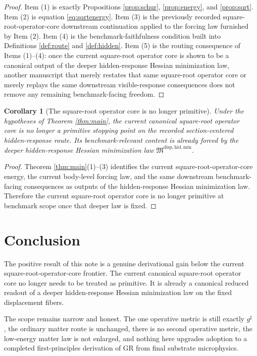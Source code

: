 \documentclass[11pt]{article}
\newcommand{\CompletedMetric}{g^{\sharp}}
\newcommand{\HiddenMinimizationPackage}{\mathfrak M^{\mathrm{disp,hid,min}}}
\newtheorem{corollary}{Corollary}
\begin{document}
\begin{proof}
Item (1) is exactly Propositions \ref{prop:schur}, \ref{prop:energy}, and \ref{prop:sqrt}. Item (2) is equation \eqref{eq:sqrtenergy}. Item (3) is the previously recorded square-root-operator-core downstream continuation applied to the forcing law furnished by Item (2). Item (4) is the benchmark-faithfulness condition built into Definitions \ref{def:route} and \ref{def:hidden}. Item (5) is the routing consequence of Items (1)--(4): once the current square-root operator core is shown to be a canonical output of the deeper hidden-response Hessian minimization law, another manuscript that merely restates that same square-root operator core or merely replays the same downstream visible-response consequences does not remove any remaining benchmark-facing freedom.
\end{proof}

\begin{corollary}[The square-root operator core is no longer primitive]
\label{cor:nonprimitive}
Under the hypotheses of Theorem \ref{thm:main}, the current canonical square-root operator core is no longer a primitive stopping point on the recorded section-centered hidden-response route. Its benchmark-relevant content is already forced by the deeper hidden-response Hessian minimization law \(\HiddenMinimizationPackage\).
\end{corollary}

\begin{proof}
Theorem \ref{thm:main}(1)--(3) identifies the current square-root-operator-core energy, the current body-level forcing law, and the same downstream benchmark-facing consequences as outputs of the hidden-response Hessian minimization law. Therefore the current square-root operator core is no longer primitive at benchmark scope once that deeper law is fixed.
\end{proof}

\section{Conclusion}

The positive result of this note is a genuine derivational gain below the current square-root-operator-core frontier. The current canonical square-root operator core no longer needs to be treated as primitive. It is already a canonical reduced readout of a deeper hidden-response Hessian minimization law on the fixed displacement fibers.

The scope remains narrow and honest. The one operative metric is still exactly \(\CompletedMetric\), the ordinary matter route is unchanged, there is no second operative metric, the low-energy matter law is not enlarged, and nothing here upgrades adoption to a completed first-principles derivation of GR from final substrate microphysics.
\end{document}
